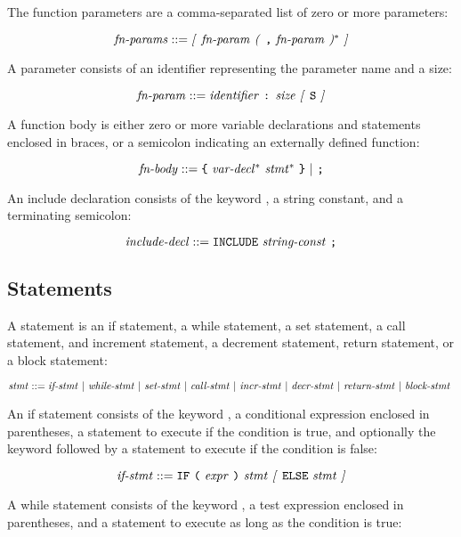 \documentclass[10pt]{article}
\begin{document}
\noindent
The function parameters are a comma-separated list of zero or more
parameters:

$$\mbox{\textit{fn-params}} ::= \mbox{\textit{[} \ensuremath{\mbox{\textit{fn-param}}} \textit{(} \texttt{,}
    \ensuremath{\mbox{\textit{fn-param}}} \textit{)}$^*$ \textit{]}}$$

\noindent
A parameter consists of an identifier representing the parameter name
and a size:

$$\mbox{\textit{fn-param}} ::= \mbox{\ensuremath{\mbox{\textit{identifier}}} \texttt{:}
  \ensuremath{\mbox{\textit{size}}} \textit{[} \texttt{S} \textit{]}}$$

\noindent
A function body is either zero or more variable declarations and
statements enclosed in braces, or a semicolon indicating an externally
defined function:

$$\mbox{\textit{fn-body}} ::= \mbox{\texttt{\{} \ensuremath{\mbox{\textit{var-decl}}}$^*$
  \ensuremath{\mbox{\textit{stmt}}}$^*$ \texttt{\}} $|$ \texttt{;}}$$

 An include declaration consists of the
keyword , a string constant, and a terminating semicolon:

$$\mbox{\textit{include-decl}} ::= \mbox{\texttt{INCLUDE}
  \ensuremath{\mbox{\textit{string-const}}} \texttt{;}}$$

\subsection{Statements}
\label{sec:syntax:statements}

A statement is an if statement, a while statement, a set statement, a
call statement, and increment statement, a decrement statement, return
statement, or a block statement:

$$\mbox{\textit{stmt}} ::= \mbox{\ensuremath{\mbox{\textit{if-stmt}}} $|$ \ensuremath{\mbox{\textit{while-stmt}}}
  $|$ \ensuremath{\mbox{\textit{set-stmt}}} $|$ \ensuremath{\mbox{\textit{call-stmt}}} $|$
  \ensuremath{\mbox{\textit{incr-stmt}}} $|$ \ensuremath{\mbox{\textit{decr-stmt}}} $|$
  \ensuremath{\mbox{\textit{return-stmt}}} $|$ \ensuremath{\mbox{\textit{block-stmt}}} }$$

 An if statement consists of the keyword
, a conditional expression enclosed in parentheses, a
statement to execute if the condition is true, and optionally the
keyword  followed by a statement to execute if the condition
is false:

$$\mbox{\textit{if-stmt}} ::= \mbox{\texttt{IF} \texttt{(} \ensuremath{\mbox{\textit{expr}}} \texttt{)}
  \ensuremath{\mbox{\textit{stmt}}} \textit{[} \texttt{ELSE} \ensuremath{\mbox{\textit{stmt}}} \textit{]}}$$

 A while statement consists of the keyword
, a test expression enclosed in parentheses, and a
statement to execute as long as the condition is true:
\end{document}
